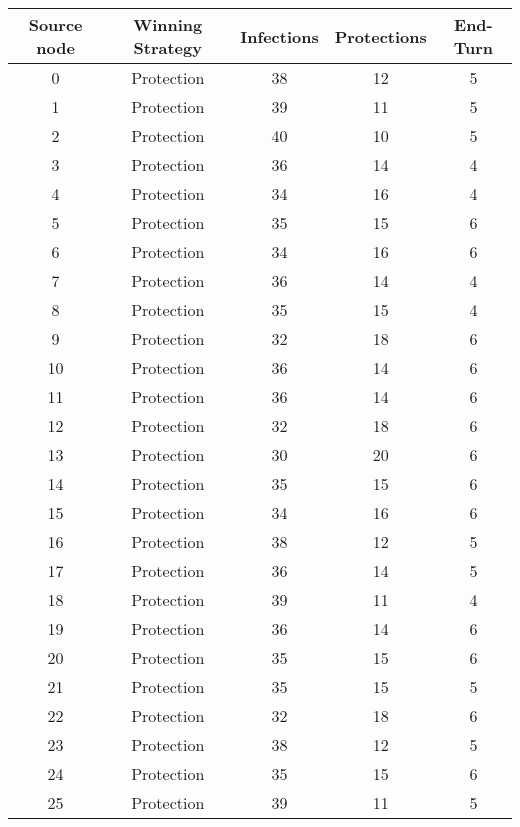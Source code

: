 \documentclass[results.tex]{subfiles}
\begin{document}
\begin{center}
  \begin{tabular}{| c || c | c | c | c |}
    \hline
    {\bfseries Source node} & {\bfseries Winning Strategy} & {\bfseries Infections} & {\bfseries Protections} & {\bfseries End-Turn} \\  %
    \hline\hline
    0 & Protection & 38 & 12 & 5 \\ 
    \hline
    1 & Protection & 39 & 11 & 5 \\ 
    \hline
    2 & Protection & 40 & 10 & 5 \\ 
    \hline
    3 & Protection & 36 & 14 & 4 \\ 
    \hline
    4 & Protection & 34 & 16 & 4 \\ 
    \hline
    5 & Protection & 35 & 15 & 6 \\ 
    \hline
    6 & Protection & 34 & 16 & 6 \\ 
    \hline
    7 & Protection & 36 & 14 & 4 \\ 
    \hline
    8 & Protection & 35 & 15 & 4 \\ 
    \hline
    9 & Protection & 32 & 18 & 6 \\ 
    \hline
    10 & Protection & 36 & 14 & 6 \\ 
    \hline
    11 & Protection & 36 & 14 & 6 \\ 
    \hline
    12 & Protection & 32 & 18 & 6 \\ 
    \hline
    13 & Protection & 30 & 20 & 6 \\ 
    \hline
    14 & Protection & 35 & 15 & 6 \\ 
    \hline
    15 & Protection & 34 & 16 & 6 \\ 
    \hline
    16 & Protection & 38 & 12 & 5 \\ 
    \hline
    17 & Protection & 36 & 14 & 5 \\ 
    \hline
    18 & Protection & 39 & 11 & 4 \\ 
    \hline
    19 & Protection & 36 & 14 & 6 \\ 
    \hline
    20 & Protection & 35 & 15 & 6 \\ 
    \hline
    21 & Protection & 35 & 15 & 5 \\ 
    \hline
    22 & Protection & 32 & 18 & 6 \\ 
    \hline
    23 & Protection & 38 & 12 & 5 \\ 
    \hline
    24 & Protection & 35 & 15 & 6 \\ 
    \hline
    25 & Protection & 39 & 11 & 5 \\ 

\end{tabular}
\end{center}
\end{document}
